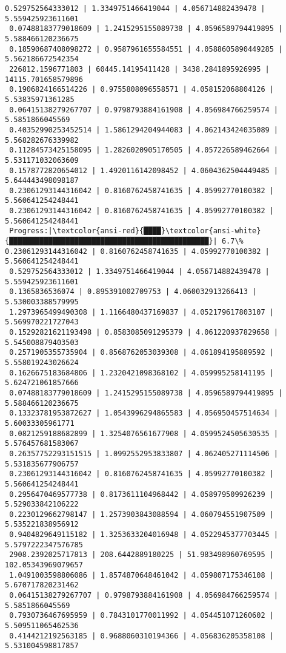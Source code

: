 \documentclass[11pt]{article}
\begin{document}
\begin{Verbatim}[commandchars=\\\{\}]
 0.529752564333012 | 1.3349751466419044 | 4.056714882439478 | 5.559425923611601
 0.07488183779018609 | 1.2415295155089738 | 4.0596589794419895 | 5.588466120236675
 0.18590687408098272 | 0.9587961655584551 | 4.0588605890449285 | 5.562186672542354
 226812.1596771803 | 60445.14195411428 | 3438.2841895926995 | 14115.701658579896
 0.1906824166514226 | 0.9755808096558571 | 4.058152068804126 | 5.53835971361285
 0.06415138279267707 | 0.9798793884161908 | 4.056984766259574 | 5.5851866045569
 0.40352990253452514 | 1.5861294204944083 | 4.062143424035089 | 5.568282676339982
 0.11284573425158095 | 1.2826020905170505 | 4.057226589462664 | 5.531171032063609
 0.1578772820654012 | 1.4920116142098452 | 4.0604362504449485 | 5.644443498098187
 0.23061293144316042 | 0.8160762458741635 | 4.05992770100382 | 5.560641254248441
 0.23061293144316042 | 0.8160762458741635 | 4.05992770100382 | 5.560641254248441
 Progress:|\textcolor{ansi-red}{████}\textcolor{ansi-white}{██████████████████████████████████████████████}| 6.7\% 0.23061293144316042 | 0.8160762458741635 | 4.05992770100382 | 5.560641254248441
 0.529752564333012 | 1.3349751466419044 | 4.056714882439478 | 5.559425923611601
 0.1365836536074 | 0.895391002709753 | 4.060032913266413 | 5.530003388579995
 1.2973965499490308 | 1.1166480437169837 | 4.052179617803107 | 5.569970221727043
 0.15292821621193498 | 0.8583085091295379 | 4.061220937829658 | 5.545008879403503
 0.2571905355735904 | 0.8568762053039308 | 4.061894195889592 | 5.558019243026624
 0.1626675183684806 | 1.2320421098368102 | 4.059995258141195 | 5.624721061857666
 0.07488183779018609 | 1.2415295155089738 | 4.0596589794419895 | 5.588466120236675
 0.13323781953872627 | 1.0543996294865583 | 4.056950457514634 | 5.60033305961771
 0.0821259188682899 | 1.3254076561677908 | 4.0599524505630535 | 5.576457681583067
 0.26357752293151515 | 1.0992552953833807 | 4.062405271114506 | 5.531835677906757
 0.23061293144316042 | 0.8160762458741635 | 4.05992770100382 | 5.560641254248441
 0.2956470469577738 | 0.8173611104968442 | 4.058979509926239 | 5.529033842106222
 0.2230129662798147 | 1.2573903843088594 | 4.060794551907509 | 5.535221838956912
 0.9404829649115182 | 1.3253633204016948 | 4.0522945377703445 | 5.5797222347576785
 2908.2392025717813 | 208.6442889180225 | 51.983498960769595 | 102.05343969079657
 1.0491003598806086 | 1.8574870648461042 | 4.059807175346108 | 5.670717820231462
 0.06415138279267707 | 0.9798793884161908 | 4.056984766259574 | 5.5851866045569
 0.7930736467695959 | 0.7843101770011992 | 4.054451071260602 | 5.509511065462536
 0.4144212192563185 | 0.9688060310194366 | 4.056836205358108 | 5.531004598817857

\end{Verbatim}
\end{document}
